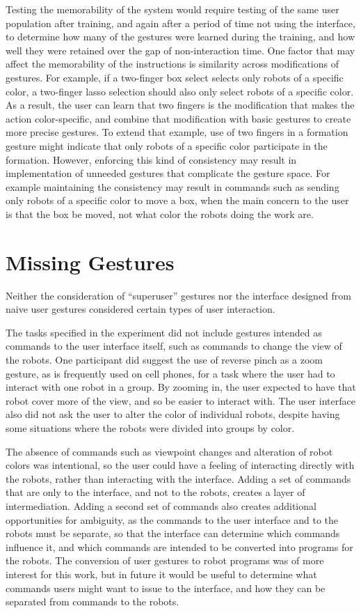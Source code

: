 Testing the memorability of the system would require testing of the same user population after training, and again after a period of time not using the interface, to determine how many of the gestures were learned during the training, and how well they were retained over the gap of non-interaction time. 
One factor that may affect the memorability of the instructions is similarity across modifications of gestures. 
For example, if a two-finger box select selects only robots of a specific color, a two-finger lasso selection should also only select robots of a specific color. 
As a result, the user can learn that two fingers is the modification that makes the action color-specific, and combine that modification with basic gestures to create more precise gestures. 
To extend that example, use of two fingers in a formation gesture might indicate that only robots of a specific color participate in the formation. 
However, enforcing this kind of consistency may result in implementation of unneeded gestures that complicate the gesture space. 
For example maintaining the consistency may result in commands such as sending only robots of a specific color to move a box, when the main concern to the user is that the box be moved, not what color the robots doing the work are.  

\section{Missing Gestures}

Neither the consideration of ``superuser'' gestures nor the interface designed from naive user gestures considered certain types of user interaction. 

The tasks specified in the experiment did not include gestures intended as commands to the user interface itself, such as commands to change the view of the robots. 
One participant did suggest the use of reverse pinch as a zoom gesture, as is frequently used on cell phones, for a task where the user had to interact with one robot in a group. 
By zooming in, the user expected to have that robot cover more of the view, and so be easier to interact with. 
The user interface also did not ask the user to alter the color of individual robots, despite having some situations where the robots were divided into groups by color. 

The absence of commands such as viewpoint changes and alteration of robot colors was intentional, so the user could have a feeling of interacting directly with the robots, rather than interacting with the interface. 
Adding a set of commands that are only to the interface, and not to the robots, creates a layer of intermediation. 
Adding a second set of commands also creates additional opportunities for ambiguity, as the commands to the user interface and to the robots must be separate, so that the interface can determine which commands influence it, and which commands are intended to be converted into programs for the robots. 
The conversion of user gestures to robot programs was of more interest for this work, but in future it would be useful to determine what commands users might want to issue to the interface, and how they can be separated from commands to the robots. 


